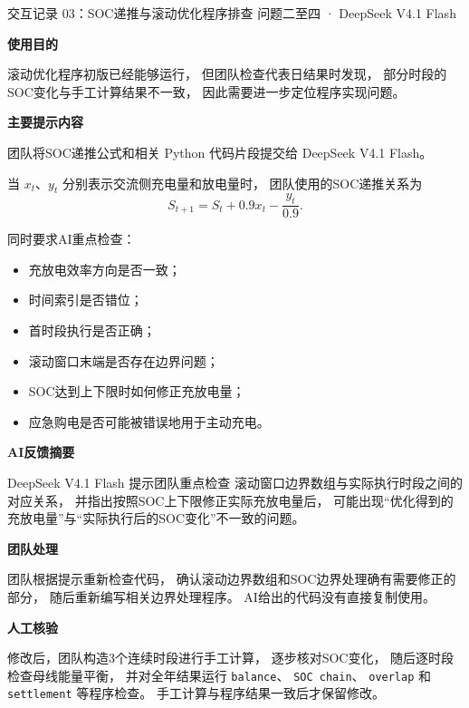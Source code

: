 \documentclass[UTF8,a4paper,11pt]{ctexart}
\newcommand{\recorditem}[1]{%
    \par\vspace{0.28em}
    \noindent\textbf{#1}\quad
}
\begin{document}
\begin{recordbox}
{交互记录 03：SOC递推与滚动优化程序排查}
{问题二至四 · DeepSeek V4.1 Flash}

\recorditem{使用目的}
滚动优化程序初版已经能够运行，
但团队检查代表日结果时发现，
部分时段的SOC变化与手工计算结果不一致，
因此需要进一步定位程序实现问题。

\recorditem{主要提示内容}
团队将SOC递推公式和相关 Python 代码片段提交给
DeepSeek V4.1 Flash。

当 $x_t$、$y_t$ 分别表示交流侧充电量和放电量时，
团队使用的SOC递推关系为
\[
S_{t+1}
=
S_t+0.9x_t-\frac{y_t}{0.9}.
\]

同时要求AI重点检查：

\begin{itemize}
    \item 充放电效率方向是否一致；
    \item 时间索引是否错位；
    \item 首时段执行是否正确；
    \item 滚动窗口末端是否存在边界问题；
    \item SOC达到上下限时如何修正充放电量；
    \item 应急购电是否可能被错误地用于主动充电。
\end{itemize}

\recorditem{AI反馈摘要}
DeepSeek V4.1 Flash 提示团队重点检查
滚动窗口边界数组与实际执行时段之间的对应关系，
并指出按照SOC上下限修正实际充放电量后，
可能出现“优化得到的充放电量”与“实际执行后的SOC变化”不一致的问题。

\recorditem{团队处理}
团队根据提示重新检查代码，
确认滚动边界数组和SOC边界处理确有需要修正的部分，
随后重新编写相关边界处理程序。
AI给出的代码没有直接复制使用。

\recorditem{人工核验}
修改后，团队构造3个连续时段进行手工计算，
逐步核对SOC变化，
随后逐时段检查母线能量平衡，
并对全年结果运行
\texttt{balance}、
\texttt{SOC chain}、
\texttt{overlap} 和
\texttt{settlement}
等程序检查。
手工计算与程序结果一致后才保留修改。

\end{recordbox}
\end{document}
